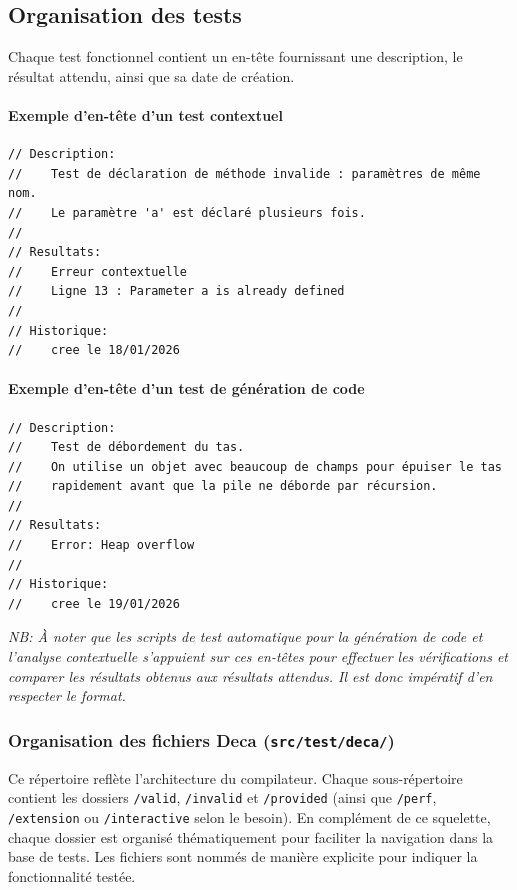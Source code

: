\subsection{Organisation des tests}
\noindent
Chaque test fonctionnel contient un en-tête fournissant une description, le résultat attendu, ainsi que sa date de création. 

\paragraph*{Exemple d'en-tête d'un test contextuel}
\begin{verbatim}
// Description:
//    Test de déclaration de méthode invalide : paramètres de même nom.
//    Le paramètre 'a' est déclaré plusieurs fois.
//
// Resultats:
//    Erreur contextuelle
//    Ligne 13 : Parameter a is already defined
//
// Historique:
//    cree le 18/01/2026
\end{verbatim}

\paragraph*{Exemple d'en-tête d'un test de génération de code}
\begin{verbatim}
// Description:
//    Test de débordement du tas.
//    On utilise un objet avec beaucoup de champs pour épuiser le tas
//    rapidement avant que la pile ne déborde par récursion.
//
// Resultats:
//    Error: Heap overflow
//
// Historique:
//    cree le 19/01/2026
\end{verbatim}
 


\noindent
\textit{NB: À noter que les scripts de test automatique pour la génération de code et l'analyse contextuelle s'appuient sur ces en-têtes pour effectuer les vérifications et comparer les résultats obtenus aux résultats attendus. Il est donc impératif d'en respecter le format. }

\subsubsection{Organisation des fichiers Deca (\texttt{src/test/deca/})}
\noindent
Ce répertoire reflète l'architecture du compilateur. Chaque sous-répertoire contient les dossiers \texttt{/valid}, \texttt{/invalid} et \texttt{/provided} (ainsi que \texttt{/perf}, \texttt{/extension} ou \texttt{/interactive} selon le besoin). En complément de ce squelette, chaque dossier est organisé thématiquement pour faciliter la navigation dans la base de tests. Les fichiers sont nommés de manière explicite pour indiquer la fonctionnalité testée.

